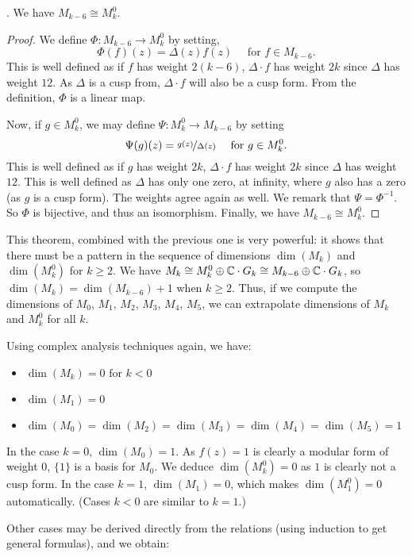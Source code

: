 \begin{theorem}\cite[p.88]{CourseInArithmetic}.
	We have $M_{k-6} \cong M_k^0$.
\end{theorem}
\begin{proof}
    We define $\Phi:M_{k-6} \to M_k^0$ by setting, 
    $$\Phi(f)(z) = \Delta(z)f(z) \quad \text{ for } f \in M_{k-6}.$$
    This is well defined as if $f$ has weight $2(k-6)$, $\Delta \cdot f$ has weight $2k$ since $\Delta$ has weight $12$. As $\Delta$ is a cusp from, $\Delta \cdot f$ will also be a cusp form.
    From the definition, $\Phi$ is a linear map.
    
    Now, if $g \in M_k^0$, we may define $\Psi: M_k^0 \to M_{k-6}$ by setting
    $$\Psi(g)(z) = \nicefrac{g(z)}{\Delta(z)} \quad \text{ for } g \in M_k^0.$$
    This is well defined as if $g$ has weight $2k$, $\Delta \cdot f$ has weight $2k$ since $\Delta$ has weight $12$.
    This is well defined as $\Delta$ has only one zero, at infinity, where $g$ also has a zero (as $g$ is a cusp form). The weights agree again as well.
    We remark that $\Psi = \Phi^{-1}$. So $\Phi$ is bijective, and thus an isomorphism. 
    Finally, we have $M_{k-6} \cong M_k^0$.
\end{proof}
This theorem, combined with the previous one is very powerful: it shows that there must be a pattern in the sequence of dimensions $\dim(M_k)$ and $\dim(M_k^0)$ for $k \geq 2$.
We have $M_k \cong M_k^0 \oplus \mathbb{C} \cdot G_k \cong M_{k-6} \oplus \mathbb{C} \cdot G_k$, so $\dim(M_k) = \dim(M_{k-6})+1$ when $k \geq 2$.
Thus, if we compute the dimensions of $M_0$, $M_1$, $M_2$, $M_3$, $M_4$, $M_5$, we can extrapolate dimensions of $M_k$ and $M_k^0$ for all $k$.

Using complex analysis techniques again, we have:
\begin{itemize}
    \item $\dim(M_k) = 0 \text{ for } k < 0$
    \item $\dim(M_1) = 0$
    \item $\dim(M_0) = \dim(M_2) = \dim(M_3) = \dim(M_4) = \dim(M_5) = 1$
\end{itemize}
In the case $k=0$, $\dim(M_0) = 1$. As $f(z) = 1$ is clearly a modular form of weight $0$, $\{1\}$ is a basis for $M_0$. We deduce $\dim(M_k^0) = 0$ as $1$ is clearly not a cusp form.
In the case $k=1$, $\dim(M_1) = 0$, which makes $\dim(M_1^0) = 0$ automatically.
(Cases $k<0$ are similar to $k=1$.)

Other cases may be derived directly from the relations (using induction to get general formulas), and we obtain:


